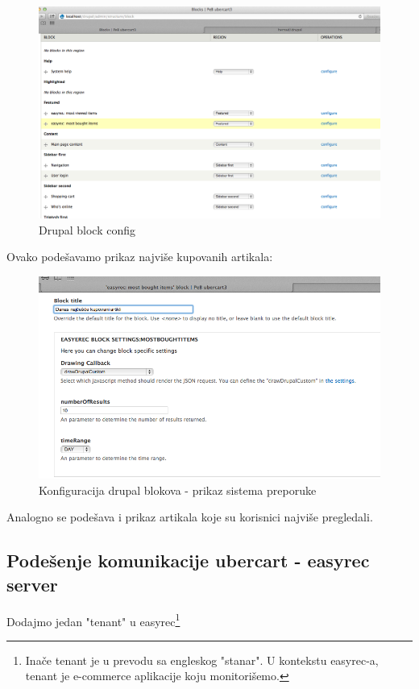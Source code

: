 \documentclass[times, utf8, seminar]{fit}
\begin{document}
{{{\begin{figure}[H]
\centering
\includegraphics[width=12cm]{img/easyrec_ubercart_blocks_config_1.png}
\caption{Drupal block config}
\end{figure}

Ovako podešavamo prikaz najviše kupovanih artikala:

\begin{figure}[H]
\centering
\includegraphics[width=12cm]{img/easyrec_ubercart_blocks_config_2.png}
\caption{Konfiguracija drupal blokova - prikaz sistema preporuke}
\end{figure}

Analogno se podešava i prikaz artikala koje su korisnici najviše pregledali.

\subsection{Podešenje komunikacije ubercart - easyrec server}

Dodajmo jedan "tenant" u easyrec\footnote{Inače tenant je u prevodu sa engleskog "stanar". U kontekstu easyrec-a, tenant je e-commerce aplikacije koju monitorišemo.}

}}}
\end{document}
